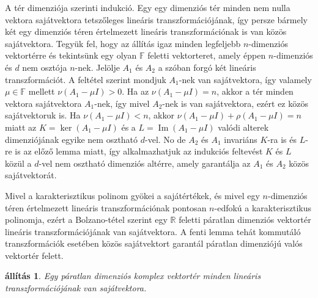 \documentclass[9pt, showtrims]{memoir}
\makeatletter
\renewenvironment{proof}[1][\proofname]
    {\par\pushQED{\qed}%
    \normalfont \topsep6\p@\@plus6\p@\relax
    \trivlist
    \item[\hskip\labelsep
        \itshape
    #1\@addpunct{:}]\ignorespaces}
    {\popQED\endtrivlist\@endpefalse}
\theoremstyle{plain}
\newtheorem{proposition}{állítás}[section]
\theoremstyle{remark}
\theoremstyle{definition}
\makeatother
\begin{document}
\begin{proof}
    A tér dimenziója szerinti indukció.
    Egy egy dimenziós tér minden nem nulla vektora sajátvektora tetszőleges lineáris transzformációjának,
    így persze bármely két egy dimenziós téren értelmezett lineáris transzformációnak is van közös
    sajátvektora.
    Tegyük fel, 
    hogy az állítás igaz minden legfeljebb $n$-dimenziós vektortérre
    és tekintsünk egy olyan $\mathbb{F}$ feletti vektorteret, 
    amely éppen $n$-dimenziós és $d$ nem osztója $n$-nek.
    Jelölje $A_1$ és $A_2$ a szóban forgó két lineáris transzformációt.
    A feltétel szerint mondjuk $A_1$-nek van sajátvektora, 
    így valamely $\mu\in\mathbb{F}$ mellett 
    $\nu\left( A_1-\mu I \right)>0.$
    Ha az 
    $\nu\left( A_1-\mu I \right)=n$, akkor a tér minden vektora sajátvektora $A_1$-nek,
    így mivel $A_2$-nek is van sajátvektora, ezért ez közös sajátvektoruk is.
    Ha 
    $\nu\left( A_1-\mu I \right)<n$, akkor 
    $\nu\left( A_1-\mu I \right)+\rho\left( A_1-\mu I \right)=n$ miatt az
    $K=\operatorname{ker}\left( A_1-\mu I \right)$ és a 
    $L=\operatorname{Im}\left( A_1-\mu I \right)$ 
    valódi alterek dimenziójának egyike nem osztható $d$-vel.
    No de $A_2$ és $A_1$ invariáns $K$-ra is és $L$-re is
    az előző lemma miatt, 
    így alkalmazhatjuk az indukciós feltevést $K$ és $L$ közül 
    a $d$-vel nem osztható dimenziós altérre,
    amely garantálja az $A_1$ és $A_2$ közös sajátvektorát.
\end{proof}

Mivel a karakterisztikus polinom gyökei a sajátértékek, és mivel egy $n$-dimenziós
téren értelmezett lineáris transzformációnak pontosan $n$-edfokú a karakterisztikus polinomja,
ezért a Bolzano-tétel szerint egy $\mathbb{R}$ feletti páratlan dimenziós vektortér lineáris transzformációjának van sajátvektora. 
A fenti lemma tehát kommutáló transzformációk esetében közös sajátvektort garantál 
páratlan dimenziójú valós vektortér felett.

\begin{proposition}
    Egy páratlan dimenziós komplex vektortér 
    minden lineáris transzformációjának van sajátvektora.
\end{proposition}
 
\end{document}
